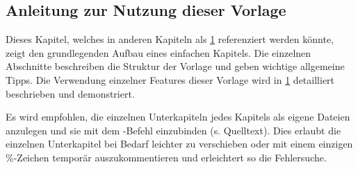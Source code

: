 \begin{showExamples}%
%
\chapter{Anleitung zur Nutzung dieser Vorlage}%
\label{chap:Examples}
%
%
Dieses Kapitel, welches in anderen Kapiteln als \cref{chap:Examples} referenziert werden könnte, zeigt den grundlegenden Aufbau eines einfachen Kapitels.
Die einzelnen Abschnitte beschreiben die Struktur der Vorlage und geben wichtige allgemeine Tipps.
Die Verwendung einzelner Features dieser Vorlage wird in \cref{chap:Examples} detailliert beschrieben und demonstriert.

Es wird empfohlen, die einzelnen Unterkapiteln jedes Kapitels als eigene Dateien anzulegen und sie mit dem \verb++-Befehl einzubinden (s. Quelltext).
Dies erlaubt die einzelnen Unterkapitel bei Bedarf leichter zu verschieben oder mit einem einzigen \%-Zeichen temporär auszukommentieren und erleichtert so die Fehlersuche.


\end{showExamples}
